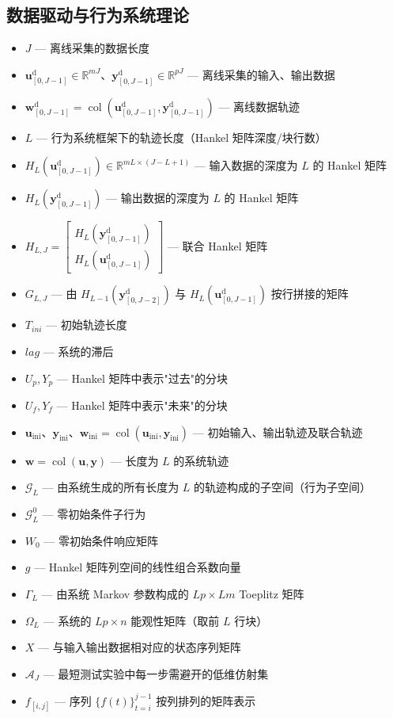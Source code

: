 \subsection*{数据驱动与行为系统理论}

\begin{itemize}
	\item $J$ — 离线采集的数据长度
	\item $\mathbf{u}^{\mathrm{d}}_{[0,J-1]}\in\mathbb{R}^{mJ}$、$\mathbf{y}^{\mathrm{d}}_{[0,J-1]}\in\mathbb{R}^{pJ}$ — 离线采集的输入、输出数据
	\item $\mathbf{w}^{\mathrm{d}}_{[0,J-1]} = \operatorname{col}(\mathbf{u}^{\mathrm{d}}_{[0,J-1]},\mathbf{y}^{\mathrm{d}}_{[0,J-1]})$ — 离线数据轨迹
	\item $L$ — 行为系统框架下的轨迹长度（Hankel 矩阵深度/块行数）
	\item $H_L(\mathbf{u}^{\mathrm{d}}_{[0,J-1]})\in\mathbb{R}^{mL\times(J-L+1)}$ — 输入数据的深度为 $L$ 的 Hankel 矩阵
	\item $H_L(\mathbf{y}^{\mathrm{d}}_{[0,J-1]})$ — 输出数据的深度为 $L$ 的 Hankel 矩阵
	\item $H_{L,J} = \begin{bmatrix} H_L(\mathbf{y}^{\mathrm{d}}_{[0,J-1]}) \\ H_L(\mathbf{u}^{\mathrm{d}}_{[0,J-1]}) \end{bmatrix}$ — 联合 Hankel 矩阵
	\item $G_{L,J}$ — 由 $H_{L-1}(\mathbf{y}^{\mathrm{d}}_{[0,J-2]})$ 与 $H_L(\mathbf{u}^{\mathrm{d}}_{[0,J-1]})$ 按行拼接的矩阵
	\item $T_{ini}$ — 初始轨迹长度
	\item $lag$ — 系统的滞后
	\item $U_p,Y_p$ — Hankel 矩阵中表示"过去"的分块
	\item $U_f,Y_f$ — Hankel 矩阵中表示"未来"的分块
	\item $\mathbf{u}_{\mathrm{ini}}$、$\mathbf{y}_{\mathrm{ini}}$、$\mathbf{w}_{\mathrm{ini}}=\operatorname{col}(\mathbf{u}_{\mathrm{ini}},\mathbf{y}_{\mathrm{ini}})$ — 初始输入、输出轨迹及联合轨迹
	\item $\mathbf{w} = \operatorname{col}(\mathbf{u},\mathbf{y})$ — 长度为 $L$ 的系统轨迹
	\item $\mathcal{G}_L$ — 由系统生成的所有长度为 $L$ 的轨迹构成的子空间（行为子空间）
	\item $\mathcal{G}_L^0$ — 零初始条件子行为
	\item $W_0$ — 零初始条件响应矩阵
	\item $g$ — Hankel 矩阵列空间的线性组合系数向量
	\item $\Gamma_L$ — 由系统 Markov 参数构成的 $Lp\times Lm$ Toeplitz 矩阵
	\item $\Omega_L$ — 系统的 $Lp\times n$ 能观性矩阵（取前 $L$ 行块）
	\item $X$ — 与输入输出数据相对应的状态序列矩阵
	\item $\mathcal{A}_J$ — 最短测试实验中每一步需避开的低维仿射集
	\item $f_{[i,j]}$ — 序列 $\{f(t)\}_{t=i}^{j-1}$ 按列排列的矩阵表示
\end{itemize}


